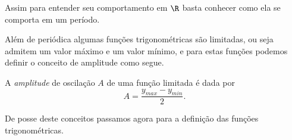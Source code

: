   Assim para entender seu comportamento em $\R$ basta conhecer como ela se comporta em um período.
  
  Além de periódica algumas funções trigonométricas são limitadas, ou seja admitem um valor máximo e um valor mínimo, e para estas funções podemos definir o conceito de amplitude como segue.
  
  \begin{defi}
  A \emph{amplitude} de oscilação $A$ de uma função limitada é dada por
  \begin{equation}
  A= \frac{y_{max} - y_{min}}{2} .
  \end{equation}
  \end{defi}
  
  De posse deste conceitos passamos agora para a definição das funções trigonométricas.
  
